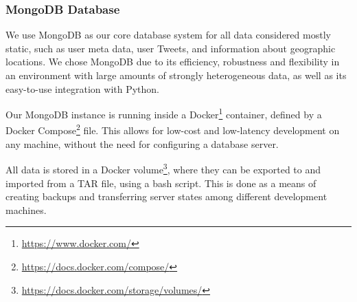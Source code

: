 \documentclass[10pt,a4paper]{article}
\begin{document}
\subsubsection{MongoDB Database}
We use MongoDB as our core database system for all data considered mostly static, such as user meta data, user Tweets, and information about geographic locations. We chose MongoDB due to its efficiency, robustness and flexibility in an environment with large amounts of strongly heterogeneous data, as well as its easy-to-use integration with Python. 

Our MongoDB instance is running inside a Docker\footnote{\href{https://www.docker.com/}{https://www.docker.com/}} container, defined by a Docker Compose\footnote{\href{https://docs.docker.com/compose/}{https://docs.docker.com/compose/}} file. This allows for low-cost and low-latency development on any machine, without the need for configuring a database server.

All data is stored in a Docker volume\footnote{\href{https://docs.docker.com/storage/volumes/}{https://docs.docker.com/storage/volumes/}}, where they can be exported to and imported from a TAR file, using a bash script. This is done as a means of creating backups and transferring server states among different development machines.
\end{document}
